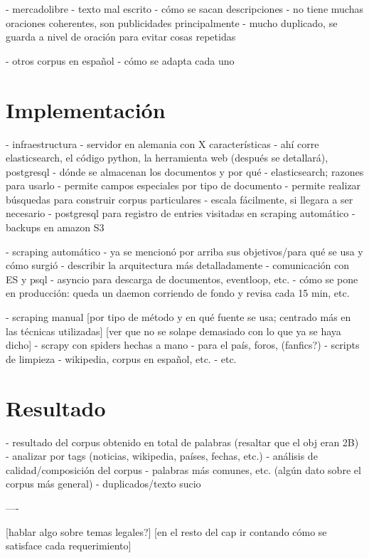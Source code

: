 - mercadolibre
    - texto mal escrito
    - cómo se sacan descripciones
    - no tiene muchas oraciones coherentes, son publicidades principalmente
    - mucho duplicado, se guarda a nivel de oración para evitar cosas repetidas

- otros corpus en español
    - cómo se adapta cada uno


\section{Implementación}

- infraestructura
    - servidor en alemania con X características
    - ahí corre elasticsearch, el código python, la herramienta web (después se detallará), postgresql
    - dónde se almacenan los documentos y por qué
        - elasticsearch; razones para usarlo
            - permite campos especiales por tipo de documento
            - permite realizar búsquedas para construir corpus particulares
            - escala fácilmente, si llegara a ser necesario
    - postgresql para registro de entries visitadas en scraping automático
    - backups en amazon S3

- scraping automático
    - ya se mencionó por arriba sus objetivos/para qué se usa y cómo surgió
    - describir la arquitectura más detalladamente
        - comunicación con ES y psql
        - asyncio para descarga de documentos, eventloop, etc.
    - cómo se pone en producción: queda un daemon corriendo de fondo y revisa cada 15 min, etc.

- scraping manual [por tipo de método y en qué fuente se usa; centrado más en las técnicas utilizadas]
[ver que no se solape demasiado con lo que ya se haya dicho]
    - scrapy con spiders hechas a mano
        - para el país, foros, (fanfics?)
    - scripts de limpieza
        - wikipedia, corpus en español, etc.
    - etc.


\section{Resultado}

- resultado del corpus obtenido en total de palabras (resaltar que el obj eran 2B)
- analizar por tags (noticias, wikipedia, países, fechas, etc.)
- análisis de calidad/composición del corpus
    - palabras más comunes, etc. (algún dato sobre el corpus más general)
    - duplicados/texto sucio


----

[hablar algo sobre temas legales?]
[en el resto del cap ir contando cómo se satisface cada requerimiento]